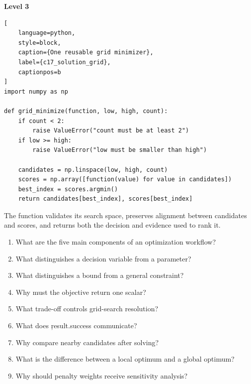 \textbf{Level 3}

\begin{lstlisting}[
    language=python,
    style=block,
    caption={One reusable grid minimizer},
    label={c17_solution_grid},
    captionpos=b
]
import numpy as np

def grid_minimize(function, low, high, count):
    if count < 2:
        raise ValueError("count must be at least 2")
    if low >= high:
        raise ValueError("low must be smaller than high")

    candidates = np.linspace(low, high, count)
    scores = np.array([function(value) for value in candidates])
    best_index = scores.argmin()
    return candidates[best_index], scores[best_index]
\end{lstlisting}

The function validates its search space, preserves alignment between candidates
and scores, and returns both the decision and evidence used to rank it.


\begin{enumerate}
    \item What are the five main components of an optimization workflow?
    \item What distinguishes a decision variable from a parameter?
    \item What distinguishes a bound from a general constraint?
    \item Why must the objective return one scalar?
    \item What trade-off controls grid-search resolution?
    \item What does \c{result.success} communicate?
    \item Why compare nearby candidates after solving?
    \item What is the difference between a local optimum and a global optimum?
    \item Why should penalty weights receive sensitivity analysis?
\end{enumerate}


